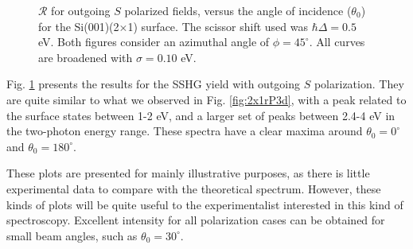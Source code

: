 \begin{figure}[h]
\centering
{}\hfill
{}
\caption{$\mathcal{R}$ for outgoing $S$ polarized fields, versus the angle of
incidence ($\theta_{0}$) for the Si(001)(2$\times$1) surface. The scissor shift
used was $\hbar\Delta = 0.5$ eV. Both figures consider an azimuthal angle of
$\phi = 45^{\circ}$. All curves are broadened with $\sigma = 0.10$ eV.}
\label{fig:2x1rS3d}
\end{figure}

Fig. \ref{fig:2x1rS3d} presents the results for the SSHG yield with outgoing $S$
polarization. They are quite similar to what we observed in Fig.
\ref{fig:2x1rP3d}, with a peak related to the surface states between 1-2 eV, and
a larger set of peaks between 2.4-4 eV in the two-photon energy range. These
spectra have a clear maxima around $\theta_{0} = 0^{\circ}$ and $\theta_{0} =
180^{\circ}$.

These plots are presented for mainly illustrative purposes, as there is little
experimental data to compare with the theoretical spectrum. However, these kinds
of plots will be quite useful to the experimentalist interested in this kind of
spectroscopy. Excellent intensity for all polarization cases can be obtained for
small beam angles, such as $\theta_{0} = 30^{\circ}$.


